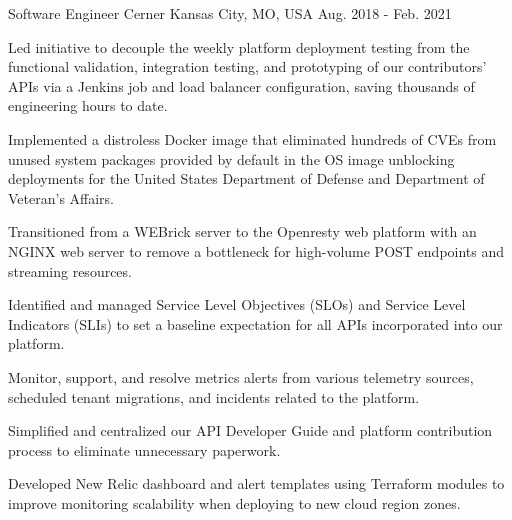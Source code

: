 \begin{cventries}
  \cventry
    {Software Engineer} %
    {Cerner} %
    {Kansas City, MO, USA} %
    {Aug. 2018 - Feb. 2021} %
    {
      \begin{cvitems} %
        \item {Led initiative to decouple the weekly platform deployment testing from the functional validation, integration testing, and prototyping of our contributors' APIs via a Jenkins job and load balancer configuration, saving thousands of engineering hours to date.}
        \item {Implemented a distroless Docker image that eliminated hundreds of CVEs from unused system packages provided by default in the OS image unblocking deployments for the United States Department of Defense and Department of Veteran's Affairs.}
        \item {Transitioned from a WEBrick server to the Openresty web platform with an NGINX web server to remove a bottleneck for high-volume POST endpoints and streaming resources.}
        \item {Identified and managed Service Level Objectives (SLOs) and Service Level Indicators (SLIs) to set a baseline expectation for all APIs incorporated into our platform.}
        \item {Monitor, support, and resolve metrics alerts from various telemetry sources, scheduled tenant migrations, and incidents related to the platform.}
        \item {Simplified and centralized our API Developer Guide and platform contribution process to eliminate unnecessary paperwork.}
        \item {Developed New Relic dashboard and alert templates using Terraform modules to improve monitoring scalability when deploying to new cloud region zones.}
      \end{cvitems}
    }
\end{cventries}

